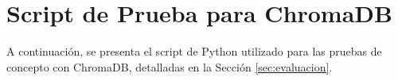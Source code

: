 
\chapter{Script de Prueba para ChromaDB}
\label{anx:chroma_script}

A continuación, se presenta el script de Python utilizado para las pruebas de concepto con ChromaDB, detalladas en la Sección \ref{sec:evaluacion}.

